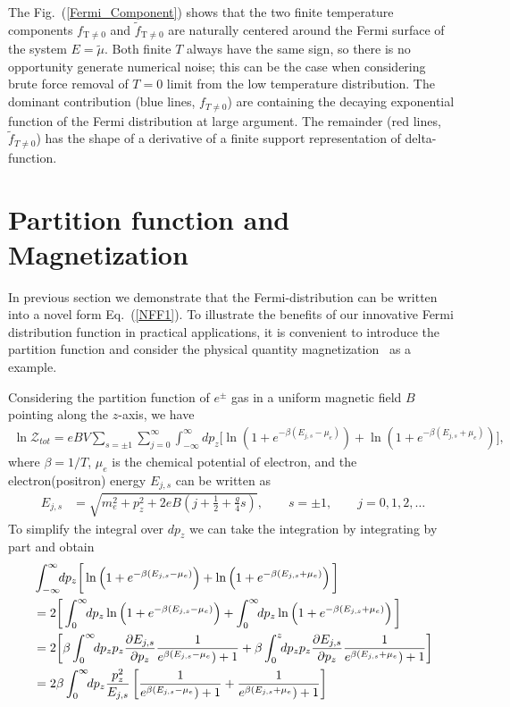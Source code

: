 \documentclass[sn-mathphys,Numbered]{sn-jnl}
\begin{document}
The Fig.~(\ref{Fermi_Component}) shows that the two finite temperature components $f_\mathrm{T\neq0}$ and $\tilde f_\mathrm{T\neq0}$ are naturally centered around the Fermi surface of the system $E=\tilde\mu$. Both finite $T$ always have the same sign, so there is no opportunity generate numerical noise; this can be the case when considering brute force removal of $T=0$ limit from the low temperature distribution. The dominant contribution (blue lines, $f_{T\ne 0}$) are containing the  decaying exponential function of the Fermi distribution at large argument. The remainder (red lines, $\tilde f_{T\ne 0}$) has the shape of a derivative of a finite support representation of delta-function. 
\vfill\eject

\section{Partition function and Magnetization}
\label{NumericalResult}
In previous section we demonstrate that the Fermi-distribution can be written into a novel form Eq.~(\ref{NFF1}). To illustrate the benefits of our innovative Fermi distribution function in practical applications, it is convenient to introduce the partition function and consider the physical quantity magnetization~\cite{Melrose:2008abc} as a example.

Considering the partition function of $e^\pm$ gas in a uniform magnetic field $B$ pointing along the $z$-axis, we have
\begin{align}
\ln\mathcal{Z}_{tot}=eBV\!\!\sum_{s=\pm1}\sum_{j=0}^\infty\int^\infty_{-\infty} \!\!dp_z\bigg[\ln\left(1+e^{-\beta(E_{j,s}-\mu_e)}\right)+\ln\left(1+e^{-\beta(E_{j,s}+\mu_e)}\right)\bigg],
\end{align}
where $\beta=1/T$, $\mu_e$ is the chemical potential of electron, and the electron(positron) energy $E_{j,s}$ can be written as
\begin{align}
E_{j,s}&=\sqrt{m^2_e+p^2_z+2eB\left(j+\frac{1}{2}+\frac{g}{4}s\right)},\qquad s=\pm1,\qquad j=0,1,2,\dots
\end{align}
To simplify the integral over $dp_z$ we can take  the integration by integrating by part and obtain
\begin{align}
&\int^\infty_{-\infty} \!\!dp_z\bigg[\ln\left(1+e^{-\beta(E_{j,s}-\mu_e)}\right)+\ln\left(1+e^{-\beta(E_{j,s}+\mu_e)}\right)\bigg]\notag\\
&=2\bigg[\int_0^\infty\!\!dp_z\ln\left(1+e^{-\beta(E_{j,s}-\mu_e)}\right)+\int_0^\infty\!\!dp_z\ln\left(1+e^{-\beta(E_{j,s}+\mu_e)}\right)\bigg]\\
&=2\bigg[\beta\int_0^\infty\!\!dp_z p_z\frac{\partial E_{j,s}}{\partial p_z}\frac{1}{e^{\beta(E_{j,s}-\mu_e})+1}+\beta\int_0^z\!\!dp_z p_z\frac{\partial E_{j,s}}{\partial p_z}\frac{1}{e^{\beta(E_{j,s}+\mu_e})+1}\bigg]\\
&=2\beta\int_0^\infty\!\!dp_z \frac{p_z^2}{E_{j,s}}\left[\frac{1}{e^{\beta(E_{j,s}-\mu_e})+1}+\frac{1}{e^{\beta(E_{j,s}+\mu_e})+1}\right]
\end{align}
\end{document}
